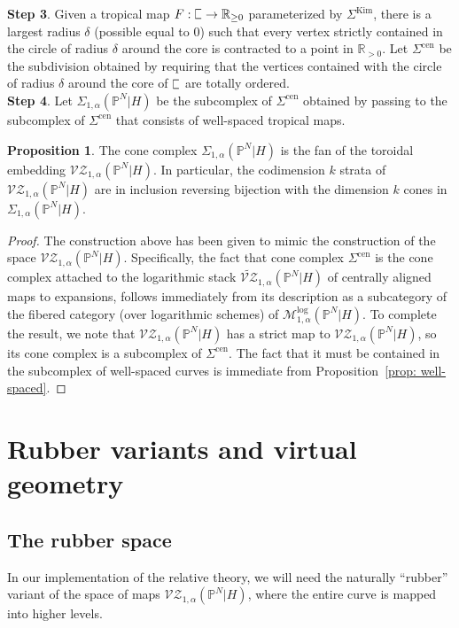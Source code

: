\documentclass[11pt]{amsart}
\newcommand{\plC}{\scalebox{0.8}[1.3]{$\sqsubset$}}
\renewcommand{\to}{\rightarrow}
\theoremstyle{definition}
\newtheorem{prop}[thm]{Proposition}
\theoremstyle{definition}
\begin{document}
\noindent
\textbf{Step 3}. Given a tropical map $F: \plC\to \mathbb R_{\geq 0}$ parameterized by $\Sigma^{\mathrm{Kim}}$, there is a largest radius $\delta$ (possible equal to $0$) such that every vertex strictly contained in the circle of radius $\delta$ around the core is contracted to a point in $\mathbb R_{>0}$. Let $
\Sigma^{\mathrm{cen}}$ be the subdivision obtained by requiring that the vertices contained with the circle of radius $\delta$ around the core of $\plC$ are totally ordered. \\

\noindent
\textbf{Step 4}. Let $
\Sigma_{1,\alpha}(\mathbb P^N|H)$ be the subcomplex of $\Sigma^{\mathrm{cen}}$ obtained by passing to the subcomplex of $\Sigma^{\mathrm{cen}}$ that consists of well-spaced tropical maps.

\begin{prop}
The cone complex $
\Sigma_{1,\alpha}(\mathbb P^N|H)$ is the fan of the toroidal embedding $
\mathcal{VZ}_{1,\alpha}(\mathbb P^N|H)$. In particular, the codimension $k$ strata of $
\mathcal{VZ}_{1,\alpha}(\mathbb P^N|H)$ are in inclusion reversing bijection with the dimension $k$ cones in $
\Sigma_{1,\alpha}(\mathbb P^N|H)$.
\end{prop}

\begin{proof}
The construction above has been given to mimic the construction of the space $
\mathcal{VZ}_{1,\alpha}(\mathbb P^N|H)$. Specifically, the fact that cone complex $\Sigma^{\mathrm{cen}}$ is the cone complex attached to the logarithmic stack $\widetilde{\mathcal{VZ}}_{1,\alpha}(\mathbb P^N|H)$ of centrally aligned maps to expansions, follows immediately from its description as a subcategory of the fibered category (over logarithmic schemes) of $\mathcal M^{\mathrm{log}}_{1,\alpha}(\mathbb P^N|H)$. To complete the result, we note that $
\mathcal{VZ}_{1,\alpha}(\mathbb P^N|H)$ has a strict map to $
\mathcal{VZ}_{1,\alpha}(\mathbb P^N|H)$, so its cone complex is a subcomplex of $\Sigma^{\mathrm{cen}}$. The fact that it must be contained in the subcomplex of well-spaced curves is immediate from Proposition~\ref{prop: well-spaced}.
\end{proof}

\section{Rubber variants and virtual geometry}

\subsection{The rubber space} In our implementation of the relative theory, we will need the naturally ``rubber'' variant of the space of maps $
\mathcal{VZ}_{1,\alpha}(\mathbb P^N|H)$, where the entire curve is mapped into higher levels. 
\end{document}
